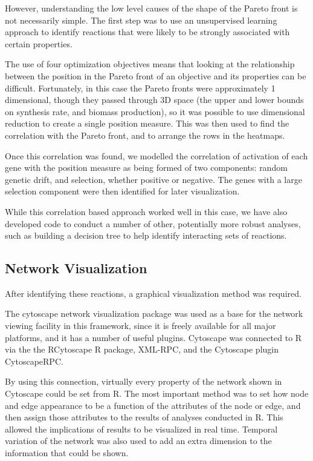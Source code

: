\documentclass[a4paper]{article}
\begin{document}
However, understanding the low level causes of the shape of the Pareto front is not necessarily simple. The first step was to use an unsupervised learning approach to identify reactions that were likely to be strongly associated with certain properties.

The use of four optimization objectives means that looking at the relationship between the position in the Pareto front of an objective and its properties can be difficult. Fortunately, in this case the Pareto fronts were approximately 1 dimensional, though they passed through 3D space (the upper and lower bounds on synthesis rate, and biomass production), so it was possible to use dimensional reduction to create a single position measure. This was then used to find the correlation with the Pareto front, and to arrange the rows in the heatmaps.

Once this correlation was found, we modelled the correlation of activation of each gene with the position measure as being formed of two components: random genetic drift, and selection, whether positive or negative. The genes with a large selection component were then identified for later visualization.

While this correlation based approach worked well in this case, we have also developed code to conduct a number of other, potentially more robust analyses, such as building a decision tree to help identify interacting sets of reactions.

\subsection{Network Visualization}
After identifying these reactions, a graphical visualization method was required.

The cytoscape network visualization package was used as a base for the network viewing facility in this framework, since it is freely available for all major platforms, and it has a number of useful plugins. Cytoscape was connected to R via the the RCytoscape R package, XML-RPC, and the Cytoscape plugin CytoscapeRPC.

By using this connection, virtually every property of the network shown in Cytoscape could be set from R. The most important method was to set how node and edge appearance to be a function of the attributes of the node or edge, and then assign those attributes to the results of analyses conducted in R. This allowed the implications of results to be visualized in real time. Temporal variation of the network was also used to add an extra dimension to the information that could be shown.
\end{document}
